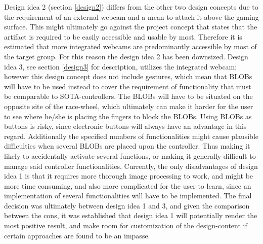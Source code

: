 Design idea 2 (section \ref{design2}) differs from the other two design concepts due to the requirement of an external webcam and a mean to attach it above the gaming surface. This might ultimately go against the project concept that states that the artifact is required to be easily accessible and usable by most. Therefore it is estimated that more integrated webcams are predominantly accessible by most of the target group. For this reason the design idea 2 has been downsized. Design idea 3, see section \ref{design3} for description, utilizes the integrated webcam; however this design concept does not include gestures, which mean that BLOBs will have to be used instead to cover the requirement of functionality that must be comparable to SOTA-controllers. The BLOBs will have to be situated on the opposite site of the race-wheel, which ultimately can make it harder for the user to see where he/she is placing the fingers to block the BLOBs. Using BLOBs as buttons is risky, since electronic buttons will always have an advantage in this regard. Additionally the specified numbers of functionalities might cause plausible difficulties when several BLOBs are placed upon the controller. Thus making it likely to accidentally activate several functions, or making it generally difficult to manage said controller functionalities. Currently, the only disadvantages of design idea 1 is that it requires more thorough image processing to work, and might be more time consuming, and also more complicated for the user to learn, since an implementation of several functionalities will have to be implemented. The final decision was ultimately between design idea 1 and 3, and given the comparison between the cons, it was established that design idea 1 will potentially render the most positive result, and make room for customization of the design-content if certain approaches are found to be an impasse. 
